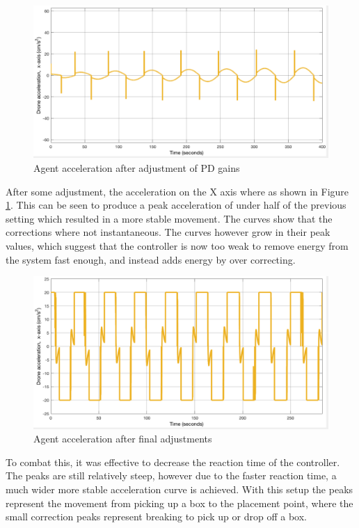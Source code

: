 \begin{figure}[H]
  \centering
  \includegraphics[width=1\columnwidth]{figures/SA_accel_pre_post_p_adjustment}
  \caption{\label{fig:post_adjust}Agent acceleration after adjustment of PD gains}
\end{figure}

After some adjustment, the acceleration on the X axis where as shown in Figure \ref{fig:post_adjust}. This can be seen to produce a peak acceleration of under half of the previous setting which resulted in a more stable movement. The curves show that the corrections where not instantaneous. The curves however grow in their peak values, which suggest that the controller is now too weak to remove energy from the system fast enough, and instead adds energy by over correcting. 

\begin{figure}[H]
  \centering
  \includegraphics[width=1\columnwidth]{figures/SA_accel_post_final_adjustment}
  \caption{\label{fig:post_limit}Agent acceleration after final adjustments}
\end{figure}


To combat this, it was effective to decrease the reaction time of the controller. The peaks are still relatively steep, however due to the faster reaction time, a much wider more stable acceleration curve is achieved. With this setup the peaks represent the movement from picking up a box to the placement point, where the small correction peaks represent breaking to pick up or drop off a box.  

